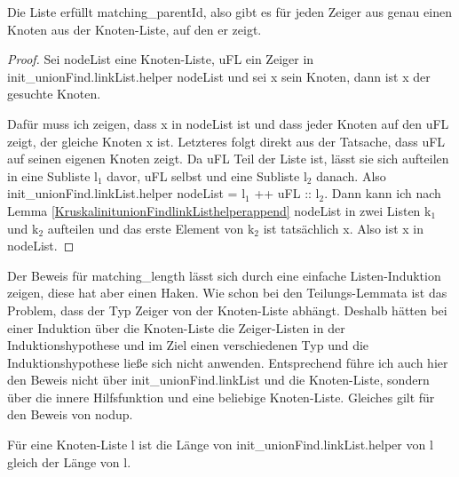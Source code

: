 \begin{lemma}[\KruskalinitunionFindlinkListmatchingparentId]
  Die Liste erfüllt mat\-ching\_parentId, also gibt es für jeden Zeiger aus \KruskalinitunionFindlinkList genau einen Knoten aus der Knoten-Liste, auf den er zeigt.
\end{lemma}
\begin{proof}
  Sei nodeList eine Knoten-Liste, uFL ein Zeiger in init\_unionFind.linkList.\-helper nodeList und sei x sein Knoten, dann ist x der gesuchte Knoten.

  Dafür muss ich zeigen, dass x in nodeList ist und dass jeder Knoten auf den uFL zeigt, der gleiche Knoten x ist.
  Letzteres folgt direkt aus der Tatsache, dass uFL auf seinen eigenen Knoten zeigt.
  Da uFL Teil der Liste ist, lässt sie sich aufteilen in eine Subliste l$_1$ davor, uFL selbst und eine Subliste l$_2$ danach.
  Also init\_unionFind.linkList.helper nodeList = l$_1$ ++ uFL :: l$_2$.
  Dann kann ich nach Lemma \ref{KruskalinitunionFindlinkListhelperappend} nodeList in zwei Listen k$_1$ und k$_2$ aufteilen
  und das erste Element von k$_2$ ist tatsächlich x.
  Also ist x in nodeList.
\end{proof}

Der Beweis für matching\_length lässt sich durch eine einfache Listen-Induktion zeigen, diese hat aber einen Haken.
Wie schon bei den Teilungs-Lemmata ist das Problem, dass der Typ Zeiger von der Knoten-Liste abhängt.
Deshalb hätten bei einer Induktion über die Knoten-Liste die Zeiger-Listen in der Induktionshypothese und im Ziel einen verschiedenen Typ und die Induktionshypothese ließe sich nicht anwenden.
Entsprechend führe ich auch hier den Beweis nicht über init\_unionFind.link\-List und die Knoten-Liste, sondern über die innere Hilfsfunktion und eine beliebige Knoten-Liste.
Gleiches gilt für den Beweis von nodup.

\begin{lemma}[\KruskalinitunionFindlinkListhelpermatchinglength]
  Für eine Knoten-Liste l ist die Länge von init\_unionFind.linkList.helper von l gleich der Länge von l.
\end{lemma}

